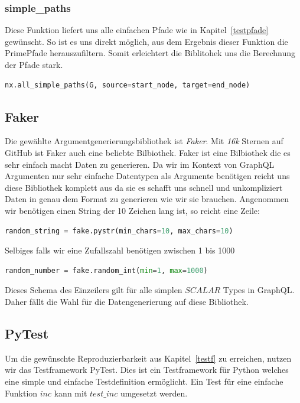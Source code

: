 \subsubsection{simple\_paths}

Diese Funktion liefert uns alle einfachen Pfade wie in Kapitel~\ref{testpfade} gewünscht.
So ist es uns direkt möglich, aus dem Ergebnis dieser Funktion die PrimePfade herauszufiltern.
Somit erleichtert die Biblitohek uns die Berechnung der Pfade stark.

\begin{lstlisting}[language=Python]
nx.all_simple_paths(G, source=start_node, target=end_node)
\end{lstlisting}


\subsection{Faker}
Die gewählte Argumentgenerierungsbibliothek ist \textit{Faker}\cite{fakergithub}.
Mit \textit{16k}\cite{fakergithub} Sternen auf GitHub ist Faker auch eine beliebte Bilbiothek.
Faker ist eine Bilbiothek die es sehr einfach macht Daten zu generieren.
Da wir im Kontext von GraphQL Argumenten nur sehr einfache Datentypen als Argumente benötigen reicht uns diese
Bibliothek komplett aus da sie es schafft uns schnell und unkompliziert Daten in genau dem Format zu generieren wie wir sie brauchen.
Angenommen wir benötigen einen String der 10 Zeichen lang ist, so reicht eine Zeile:

\begin{lstlisting}[language=Python]
random_string = fake.pystr(min_chars=10, max_chars=10)
\end{lstlisting}

Selbiges falls wir eine Zufallszahl benötigen zwischen 1 bis 1000

\begin{lstlisting}[language=Python]
random_number = fake.random_int(min=1, max=1000)
\end{lstlisting}

Dieses Schema des Einzeilers gilt für alle simplen $SCALAR$ Types in GraphQL.
Daher fällt die Wahl für die Datengenerierung auf diese Bibliothek.

\subsection{PyTest}

Um die gewünschte Reproduzierbarkeit aus Kapitel~\ref{testf} zu erreichen, nutzen wir das Testframework PyTest.
Dies ist ein Testframework für Python welches eine simple und einfache Testdefinition ermöglicht.
Ein Test für eine einfache Funktion $inc$ kann mit $test\_inc$ umgesetzt werden.

